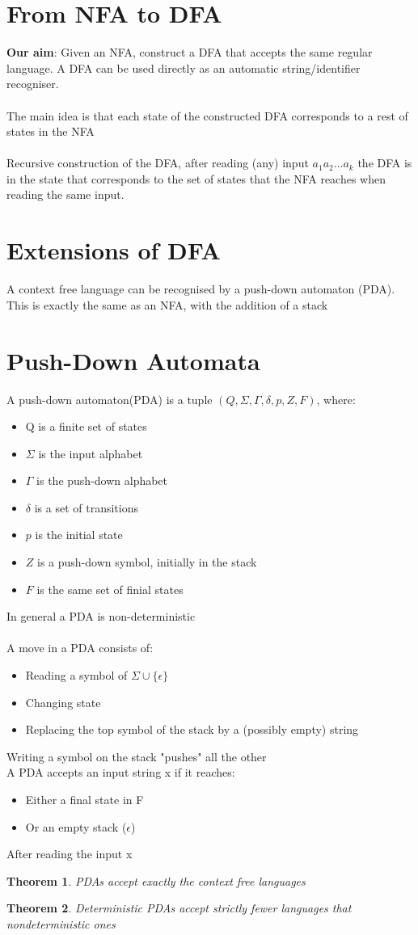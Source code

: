 \documentclass{article}[18pt]
\newtheorem{theorem}{Theorem}
\begin{document}
\section{From NFA to DFA}
\textbf{Our aim}: Given an NFA, construct a DFA that accepts the same regular language. A DFA can be used directly as an automatic string/identifier recogniser.\\
\\
The main idea is that each state of the constructed DFA corresponds to a rest of states in the NFA\\
\\
Recursive construction of the DFA, after reading (any) input $a_1a_2\ldots a_k$ the DFA is in the state that corresponds to the set of states that the NFA reaches when reading the same input.
\section{Extensions of DFA}
A context free language can be recognised by a push-down automaton (PDA). This is exactly the same as an NFA, with the addition of a stack
\section{Push-Down Automata}
A push-down automaton(PDA) is a tuple $(Q,\Sigma, \Gamma, \delta, p, Z, F)$, where:
\begin{itemize}
	\item Q is a finite set of states
	\item $\Sigma$ is the input alphabet
	\item $\Gamma$ is the push-down alphabet
	\item $\delta$ is a set of transitions
	\item $p$ is the initial state
	\item $Z$ is a push-down symbol, initially in the stack
	\item $F$ is the same set of finial states
\end{itemize}
In general a PDA is non-deterministic\\
\\
A move in a PDA consists of:
\begin{itemize}
	\item Reading a symbol of $\Sigma \cup \{\epsilon\}$
	\item Changing state
	\item Replacing the top symbol of the stack by a (possibly empty) string
\end{itemize}
Writing a symbol on the stack "pushes" all the other\\
A PDA accepts an input string x if it reaches:
\begin{itemize}
	\item Either a final state in F
	\item Or an empty stack ($\epsilon$)
\end{itemize}
After reading the input x
\begin{theorem}
	PDAs accept exactly the context free languages
\end{theorem}

\begin{theorem}
	Deterministic PDAs accept strictly fewer languages that nondeterministic ones
\end{theorem}
\end{document}
